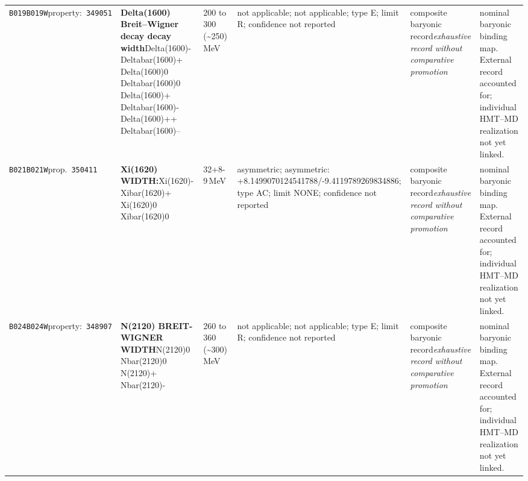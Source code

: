 \begin{landscape}
\begin{longtable}{L{1.85cm}L{4.45cm}L{2.35cm}L{4.05cm}L{3.35cm}L{7.15cm}}
\texttt{B019}\newline \texttt{B019W}\newline property:\ \texttt{349051} & \textbf{Delta(1600) Breit--Wigner decay decay width}\newline Delta(1600)- \textbar{}\allowbreak{} Deltabar(1600)+ \textbar{}\allowbreak{} Delta(1600)0 \textbar{}\allowbreak{} Deltabar(1600)0 \textbar{}\allowbreak{} Delta(1600)+ \textbar{}\allowbreak{} Deltabar(1600)- \textbar{}\allowbreak{} Delta(1600)++ \textbar{}\allowbreak{} Deltabar(1600)-- & 200 to 300 (\textasciitilde{}250)\,MeV & not applicable; not applicable; type E; limit R; confidence not reported & composite baryonic record\newline \emph{exhaustive record without comparative promotion} & nominal baryonic binding map. External record accounted for; individual HMT--MD realization not yet linked. \\
\texttt{B021}\newline \texttt{B021W}\newline prop.\ \texttt{350411} & \textbf{Xi(1620) WIDTH:}\newline Xi(1620)- \textbar{}\allowbreak{} Xibar(1620)+ \textbar{}\allowbreak{} Xi(1620)0 \textbar{}\allowbreak{} Xibar(1620)0 & 32+8-9\,MeV & asymmetric; asymmetric: +8.1499070124541788/-9.4119789269834886; type AC; limit NONE; confidence not reported & composite baryonic record\newline \emph{exhaustive record without comparative promotion} & nominal baryonic binding map. External record accounted for; individual HMT--MD realization not yet linked. \\
\texttt{B024}\newline \texttt{B024W}\newline property:\ \texttt{348907} & \textbf{N(2120) BREIT-WIGNER WIDTH}\newline N(2120)0 \textbar{}\allowbreak{} Nbar(2120)0 \textbar{}\allowbreak{} N(2120)+ \textbar{}\allowbreak{} Nbar(2120)- & 260 to 360 (\textasciitilde{}300)\,MeV & not applicable; not applicable; type E; limit R; confidence not reported & composite baryonic record\newline \emph{exhaustive record without comparative promotion} & nominal baryonic binding map. External record accounted for; individual HMT--MD realization not yet linked. \\

\end{longtable}
\end{landscape}
